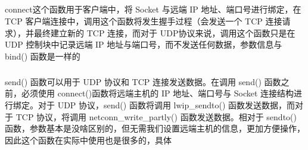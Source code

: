 \documentclass[a4paper,12pt,english]{sphinxmanual}
\begin{document}
{{\begin{sphinxVerbatim}[commandchars=\\\{\}]
\end{sphinxVerbatim}


\subparagraph{}
\label{\detokenize{exp-esp32/socket/tcp:connect}}
\sphinxAtStartPar
connect这个函数用于客户端中，将 Socket 与远端 IP 地址、端口号进行绑定，在 TCP 客户端连接中，调用这个函数将发生握手过程（会发送一个 TCP 连接请求），并最终建立新的 TCP 连接，而对于 UDP协议来说，调用这个函数只是在 UDP 控制块中记录远端 IP 地址与端口号，而不发送任何数据，参数信息与 bind() 函数是一样的

\begin{sphinxVerbatim}[commandchars=\\\{\}]
\end{sphinxVerbatim}


\subparagraph{}
\label{\detokenize{exp-esp32/socket/tcp:send}}
\sphinxAtStartPar
send() 函数可以用于 UDP 协议和 TCP 连接发送数据。在调用 send() 函数之前，必须使用 connect()函数将远端主机的 IP 地址、端口号与 Socket 连接结构进行绑定。对于 UDP 协议，send() 函数将调用 lwip\_sendto() 函数发送数据，而对于 TCP 协议，将调用 netconn\_write\_partly() 函数发送数据。相对于 sendto() 函数，参数基本是没啥区别的，但无需我们设置远端主机的信息，更加方便操作，因此这个函数在实际中使用也是很多的，具体

\begin{sphinxVerbatim}[commandchars=\\\{\}]
\end{sphinxVerbatim}


}}
\end{document}
